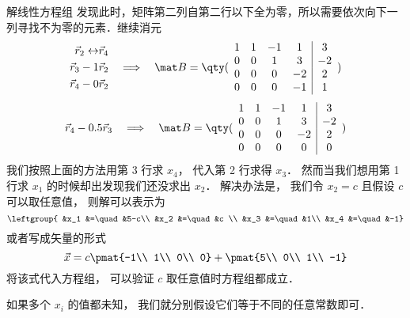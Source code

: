 \begin{exam}{解线性方程组}
发现此时，矩阵第二列自第二行以下全为零，所以需要依次向下一列寻找不为零的元素．继续消元
\begin{equation}
\begin{aligned}
\vec r_2 \leftrightarrow &\vec r_4 \\
\vec r_3 - 1 &\vec r_2 \\
\vec r_4 - 0 &\vec r_2 \\
\end{aligned}
\quad \Longrightarrow \quad
\mat B={
	\qty(\begin{array}{cccc|c}
	1 &1 &-1  &1   &3  \\
	0 &0 &1   &3   &-2 \\
	0 &0 &0   &-2  &2  \\
	0 &0 &0   &-1  &1 \\
	\end{array} 
	)}
\end{equation}
\begin{equation}
\vec r_4 - 0.5 \vec r_3
\quad \Longrightarrow \quad
\mat B={
	\qty(\begin{array}{cccc|c}
	1 &1 &-1  &1   &3  \\
	0 &0 &1   &3   &-2 \\
	0 &0 &0   &-2  &2  \\
	0 &0 &0   &0   &0  \\
	\end{array} 
	)}
\end{equation}
我们按照上面的方法用第 3 行求 $x_4$， 代入第 2 行求得 $x_3$． 然而当我们想用第 1 行求 $x_1$ 的时候却出发现我们还没求出 $x_2$． 解决办法是， 我们令 $x_2 = c$ 且假设 $c$ 可以取任意值， 则解可以表示为
\begin{equation}
\leftgroup{
&x_1 &=\quad &5-c\\
&x_2 &=\quad &c \\
&x_3 &=\quad &1\\
&x_4 &=\quad &-1}
\end{equation}
或者写成矢量的形式
\begin{equation}
\vec x = c \pmat{-1\\ 1\\ 0\\ 0} + \pmat{5\\ 0\\ 1\\ -1}
\end{equation}
将该式代入方程组， 可以验证 $c$ 取任意值时方程组都成立．

如果多个 $x_i$ 的值都未知， 我们就分别假设它们等于不同的任意常数即可．
\end{exam}

